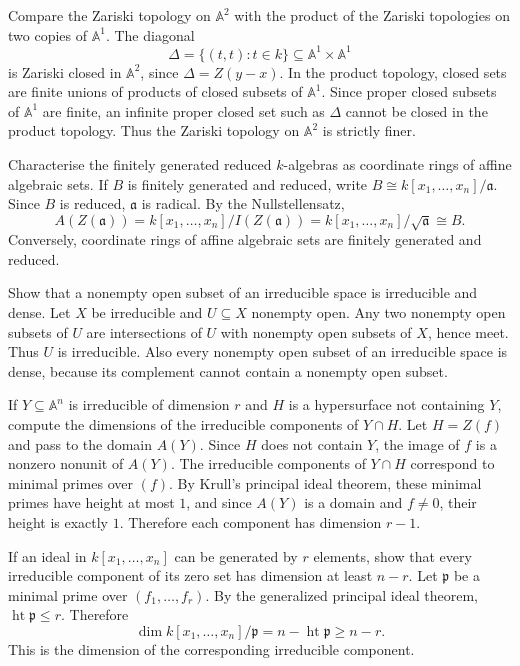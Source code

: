 \documentclass[12pt]{article}
\theoremstyle{plain}
\theoremstyle{definition}
\newcommand{\bb}[1]{\mathbb{#1}}
\newcommand{\height}{\operatorname{ht}}
\begin{document}
\questionpar Compare the Zariski topology on $\bb A^2$ with the product of the Zariski topologies on two copies of $\bb A^1$.
\solutionpar The diagonal
\[
\Delta=\{(t,t):t\in k\}\subseteq\bb A^1\times\bb A^1
\]
is Zariski closed in $\bb A^2$, since $\Delta=Z(y-x)$. In the product topology, closed sets are finite unions of products of closed subsets of $\bb A^1$. Since proper closed subsets of $\bb A^1$ are finite, an infinite proper closed set such as $\Delta$ cannot be closed in the product topology. Thus the Zariski topology on $\bb A^2$ is strictly finer.

\questionpar Characterise the finitely generated reduced $k$-algebras as coordinate rings of affine algebraic sets.
\solutionpar If $B$ is finitely generated and reduced, write $B\cong k[x_1,\ldots,x_n]/\mathfrak a$. Since $B$ is reduced, $\mathfrak a$ is radical. By the Nullstellensatz,
\[
A(Z(\mathfrak a))=k[x_1,\ldots,x_n]/I(Z(\mathfrak a))=k[x_1,\ldots,x_n]/\sqrt{\mathfrak a}\cong B.
\]
Conversely, coordinate rings of affine algebraic sets are finitely generated and reduced.

\questionpar Show that a nonempty open subset of an irreducible space is irreducible and dense.
\solutionpar Let $X$ be irreducible and $U\subseteq X$ nonempty open. Any two nonempty open subsets of $U$ are intersections of $U$ with nonempty open subsets of $X$, hence meet. Thus $U$ is irreducible. Also every nonempty open subset of an irreducible space is dense, because its complement cannot contain a nonempty open subset.

\questionpar If $Y\subseteq\bb A^n$ is irreducible of dimension $r$ and $H$ is a hypersurface not containing $Y$, compute the dimensions of the irreducible components of $Y\cap H$.
\solutionpar Let $H=Z(f)$ and pass to the domain $A(Y)$. Since $H$ does not contain $Y$, the image of $f$ is a nonzero nonunit of $A(Y)$. The irreducible components of $Y\cap H$ correspond to minimal primes over $(f)$. By Krull's principal ideal theorem, these minimal primes have height at most $1$, and since $A(Y)$ is a domain and $f\neq0$, their height is exactly $1$. Therefore each component has dimension $r-1$.

\questionpar If an ideal in $k[x_1,\ldots,x_n]$ can be generated by $r$ elements, show that every irreducible component of its zero set has dimension at least $n-r$.
\solutionpar Let $\mathfrak p$ be a minimal prime over $(f_1,\ldots,f_r)$. By the generalized principal ideal theorem, $\height\mathfrak p\leq r$. Therefore
\[
\dim k[x_1,\ldots,x_n]/\mathfrak p=n-\height\mathfrak p\geq n-r.
\]
This is the dimension of the corresponding irreducible component.
\end{document}
